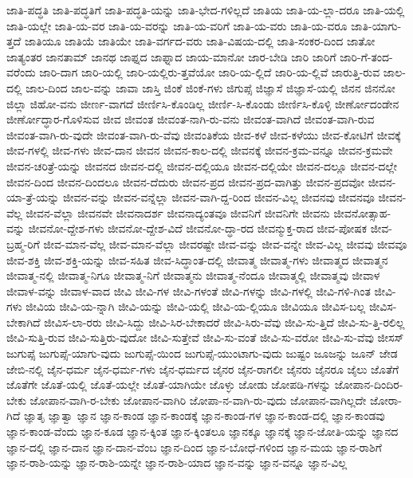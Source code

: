 {ಜಾತಿ-ಪದ್ಧತಿ
ಜಾತಿ-ಪದ್ಧತಿಗೆ
ಜಾತಿ-ಪದ್ಧತಿ-ಯನ್ನು
ಜಾತಿ-ಭೇದ-ಗಳಿಲ್ಲದೆ
ಜಾತಿಯ
ಜಾತಿ-ಯ-ಲ್ಲಾ-ದರೂ
ಜಾತಿ-ಯಲ್ಲಿ
ಜಾತಿ-ಯಲ್ಲೇ
ಜಾತಿ-ಯ-ವರ
ಜಾತಿ-ಯ-ವರನ್ನು
ಜಾತಿ-ಯ-ವರಿಗೆ
ಜಾತಿ-ಯ-ವರು
ಜಾತಿ-ಯ-ವರೂ
ಜಾತಿ-ಯಾಗು-ತ್ತದೆ
ಜಾತಿಯೂ
ಜಾತಿಯೆ
ಜಾತಿಯೇ
ಜಾತಿ-ವರ್ಗದ-ವರು
ಜಾತಿ-ವಿಷಯ-ದಲ್ಲಿ
ಜಾತಿ-ಸಂಕರ-ದಿಂದ
ಜಾತೋ
ಜಾತ್ಯಂತರ
ಜಾನತಾಮ್
ಜಾನಥ
ಜಾಫ್ನದ
ಜಾಫ್ನಾದ
ಜಾಯ-ಮಾನೋ
ಜಾರ-ಬೇಡಿ
ಜಾರಿ
ಜಾರಿಗೆ
ಜಾರಿ-ಗೆ-ತಂದ-ವರೆಂದು
ಜಾರಿ-ದಾಗ
ಜಾರಿ-ಯಲ್ಲಿ
ಜಾರಿ-ಯಲ್ಲಿರು-ತ್ತವೆಯೋ
ಜಾರಿ-ಯ-ಲ್ಲಿದೆ
ಜಾರಿ-ಯ-ಲ್ಲಿವೆ
ಜಾರುತ್ತಿ-ರುವ
ಜಾಲ-ದಲ್ಲಿ
ಜಾಲ-ದಿಂದ
ಜಾಲ-ವನ್ನು
ಜಾವಾ
ಜಾಸ್ತಿ
ಜಿಂಕೆ
ಜಿಂಕೆ-ಗಳು
ಜಿಗುಪ್ಸೆ
ಜಿಜ್ಞಾಸೆ
ಜಿಜ್ಞಾಸೆ-ಯಲ್ಲಿ
ಜಿನನ
ಜಿನನೋ
ಜಿಲ್ಲಾ
ಜಿಹೋ-ವನು
ಜೀರ್ಣ-ವಾಗದೆ
ಜೀರ್ಣಿಸಿ-ಕೊಂಡಿಲ್ಲ
ಜೀರ್ಣಿ-ಸಿ-ಕೊಂಡು
ಜೀರ್ಣಿಸಿ-ಕೊಳ್ಳಿ
ಜೀರ್ಣೋದಂಡೇನ
ಜೀರ್ಣೋದ್ಧಾರ-ಗೊಳಿಸುವ
ಜೀವ
ಜೀವಂತ
ಜೀವಂತ-ನಾಗಿ-ರು-ವನು
ಜೀವಂತ-ವಾಗಿದೆ
ಜೀವಂತ-ವಾಗಿ-ರುವ
ಜೀವಂತ-ವಾಗಿ-ರು-ವುದೇ
ಜೀವಂತ-ವಾಗಿ-ರು-ವೆವು
ಜೀವಂತಿಕೆಯ
ಜೀವ-ಕಳೆ
ಜೀವ-ಕಳೆಯು
ಜೀವ-ಕೋಟಿಗೆ
ಜೀವಕ್ಕೆ
ಜೀವ-ಗಳಲ್ಲಿ
ಜೀವ-ಗಳು
ಜೀವ-ದಾನ
ಜೀವನ
ಜೀವನ-ಕಾಲ-ದಲ್ಲಿ
ಜೀವನಕ್ಕೆ
ಜೀವನ-ಕ್ರಮ-ವನ್ನೂ
ಜೀವನ-ಕ್ರಮವೇ
ಜೀವನ-ಚರಿತ್ರೆ-ಯನ್ನು
ಜೀವನದ
ಜೀವನ-ದಲ್ಲಿ
ಜೀವನ-ದಲ್ಲಿಯೂ
ಜೀವನ-ದಲ್ಲಿಯೇ
ಜೀವನ-ದಲ್ಲೂ
ಜೀವನ-ದಲ್ಲೇ
ಜೀವನ-ದಿಂದ
ಜೀವನ-ದಿಂದಲೂ
ಜೀವನ-ದೆದುರು
ಜೀವನ-ಪ್ರದ
ಜೀವನ-ಪ್ರದ-ವಾಗಿತ್ತು
ಜೀವನ-ಪ್ರದವೋ
ಜೀವನ-ಯಾ-ತ್ರೆ-ಯನ್ನು
ಜೀವನ-ವನ್ನು
ಜೀವನ-ವನ್ನೆಲ್ಲಾ
ಜೀವನ-ವಾಗಿ-ದ್ದ-ರಿಂದ
ಜೀವನ-ವಿಲ್ಲ
ಜೀವನವು
ಜೀವನವೂ
ಜೀವನ-ವೆಲ್ಲ
ಜೀವನ-ವೆಲ್ಲಾ
ಜೀವನವೇ
ಜೀವನಾದರ್ಶ
ಜೀವನಾದ್ಯಂತವೂ
ಜೀವನಿಗೆ
ಜೀವನಿಗೇ
ಜೀವನು
ಜೀವನೋತ್ಸಾಹ-ವನ್ನು
ಜೀವನೋ-ದ್ದೇಶ-ಗಳು
ಜೀವನೋ-ದ್ದೇಶ-ವಿದೆ
ಜೀವನೋ-ದ್ಧಾ-ರದ
ಜೀವನ್ಮುಕ್ತ-ರಾದ
ಜೀವ-ಪೋಷಕ
ಜೀವ-ಬ್ರಹ್ಮ-ರಿಗೆ
ಜೀವ-ಮಾನ-ವೆಲ್ಲ
ಜೀವ-ಮಾನ-ವೆಲ್ಲಾ
ಜೀವರಷ್ಟೇ
ಜೀವ-ವನ್ನು
ಜೀವ-ವನ್ನೇ
ಜೀವ-ವಿಲ್ಲ
ಜೀವವು
ಜೀವವೂ
ಜೀವ-ಶಕ್ತಿ
ಜೀವ-ಶಕ್ತಿ-ಯನ್ನು
ಜೀವ-ಸಹಿತ
ಜೀವ-ಸಿದ್ಧಾಂತ-ದಲ್ಲಿ
ಜೀವಾತ್ಮ
ಜೀವಾತ್ಮ-ಗಳು
ಜೀವಾತ್ಮದ
ಜೀವಾತ್ಮನ
ಜೀವಾತ್ಮ-ನಲ್ಲಿ
ಜೀವಾತ್ಮ-ನಿಗೂ
ಜೀವಾತ್ಮ-ನಿಗೆ
ಜೀವಾತ್ಮನು
ಜೀವಾತ್ಮ-ನೆಂದೂ
ಜೀವಾತ್ಮಲ್ಲಿ
ಜೀವಾತ್ಮವು
ಜೀವಾಳ
ಜೀವಾಳ-ವನ್ನು
ಜೀವಾಳ-ವಾದ
ಜೀವಿ
ಜೀವಿ-ಗಳ
ಜೀವಿ-ಗಳಂತೆ
ಜೀವಿ-ಗಳನ್ನು
ಜೀವಿ-ಗಳಲ್ಲಿ
ಜೀವಿ-ಗಳಿ-ಗಿಂತ
ಜೀವಿ-ಗಳು
ಜೀವಿಯ
ಜೀವಿ-ಯ-ನ್ನಾಗಿ
ಜೀವಿ-ಯನ್ನು
ಜೀವಿ-ಯಲ್ಲಿ
ಜೀವಿ-ಯ-ಲ್ಲಿಯೂ
ಜೀವಿಯೂ
ಜೀವಿಸ-ಬಲ್ಲ
ಜೀವಿಸ-ಬೇಕಾಗಿದೆ
ಜೀವಿಸ-ಲಾ-ರರು
ಜೀವಿ-ಸಿದ್ದು
ಜೀವಿ-ಸಿರ-ಬೇಕಾದರೆ
ಜೀವಿ-ಸಿರು-ವೆವು
ಜೀವಿ-ಸು-ತ್ತಿದೆ
ಜೀವಿ-ಸು-ತ್ತಿ-ರಲಿಲ್ಲ
ಜೀವಿ-ಸುತ್ತಿ-ರುವ
ಜೀವಿ-ಸುತ್ತಿರು-ವುದೋ
ಜೀವಿ-ಸುತ್ತೇವೆ
ಜೀವಿ-ಸು-ವಂತೆ
ಜೀವಿ-ಸು-ವರೋ
ಜೀವಿ-ಸು-ವೆವು
ಜೀಸಸ್
ಜುಗುಪ್ಸೆ
ಜುಗುಪ್ಸೆ-ಯಾಗು-ವುದು
ಜುಗುಪ್ಸೆ-ಯಿಂದ
ಜುಗುಪ್ಸೆ-ಯುಂಟಾಗು-ವುದು
ಜುಷ್ಟಂ
ಜೂಜನ್ನು
ಜೂನ್
ಜೇಡ
ಜೇಬಿ-ನಲ್ಲಿ
ಜೈನ-ಧರ್ಮ
ಜೈನ-ಧರ್ಮ-ಗಳು
ಜೈನ-ಧರ್ಮದ
ಜೈನರ
ಜೈನ-ರಾಗಲೀ
ಜೈನರು
ಜೈನರೂ
ಜೈಲು
ಜೊತೆಗೆ
ಜೊತೆಗೇ
ಜೊತೆ-ಯಲ್ಲಿ
ಜೊತೆ-ಯಲ್ಲೇ
ಜೊತೆ-ಯಾಗಿಯೇ
ಜೊಳ್ಳು
ಜೋಡು
ಜೋಪಡಿ-ಗಳನ್ನು
ಜೋಪಾನ-ದಿಂದಿರ-ಬೇಕು
ಜೋಪಾನ-ವಾಗಿ-ರ-ಬೇಕು
ಜೋಪಾನ-ವಾಗಿರಿ
ಜೋಪಾ-ನ-ವಾಗಿ-ರು-ವುದು
ಜೋಪಾನ-ವಾಗಿಲ್ಲದೇ
ಜೋರಾ-ಗಿದೆ
ಜ್ಞಾತೃ
ಜ್ಞಾತ್ವಾ
ಜ್ಞಾನ
ಜ್ಞಾನ-ಕಾಂಡ
ಜ್ಞಾನ-ಕಾಂಡಕ್ಕೆ
ಜ್ಞಾನ-ಕಾಂಡ-ಗಳ
ಜ್ಞಾನ-ಕಾಂಡ-ದಲ್ಲಿ
ಜ್ಞಾನ-ಕಾಂಡವು
ಜ್ಞಾನ-ಕಾಂಡ-ವೆಂದು
ಜ್ಞಾನ-ಕೂಡ
ಜ್ಞಾನ-ಕ್ಕಿಂತ
ಜ್ಞಾನ-ಕ್ಕಿಂತಲೂ
ಜ್ಞಾನಕ್ಕೂ
ಜ್ಞಾನಕ್ಕೆ
ಜ್ಞಾನ-ಜೋತಿ-ಯನ್ನು
ಜ್ಞಾನದ
ಜ್ಞಾನ-ದಲ್ಲಿ
ಜ್ಞಾನ-ದಾನ
ಜ್ಞಾನ-ದಾನ-ವೆಂಬ
ಜ್ಞಾನ-ದಿಂದ
ಜ್ಞಾನ-ಬೋಧೆ-ಗಳಿಂದ
ಜ್ಞಾನ-ಮಯ
ಜ್ಞಾನ-ರಾಶಿಗೆ
ಜ್ಞಾನ-ರಾಶಿ-ಯನ್ನು
ಜ್ಞಾನ-ರಾಶಿ-ಯನ್ನೇ
ಜ್ಞಾನ-ರಾಶಿ-ಯಾದ
ಜ್ಞಾನ-ವನ್ನು
ಜ್ಞಾನ-ವನ್ನೂ
ಜ್ಞಾನ-ವಿಲ್ಲ
}
